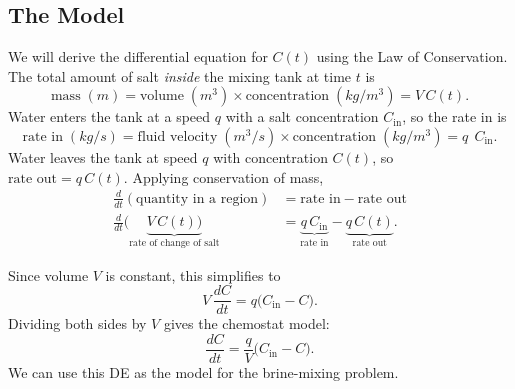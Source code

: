 \documentclass[09pt,letterpaper]{article}
\begin{document}
\subsection{The Model}

We will derive the differential equation for $C(t)$ using the Law of Conservation. The total amount of salt \emph{inside} the mixing tank at time $t$ is
\[
\text{mass} \;(m) = \text{volume} \;(m^3) \times \text{concentration} \;(kg/m^3)= V\,C(t).
\]
Water enters the tank at a speed $q$ with a salt concentration $C_{\text{in}}$, so the rate in is
\[
\text{rate in} \;(kg/s) = \text{fluid velocity}\;(m^3/s)\times \text{concentration}\;(kg/m^3)  = q\;\,C_{\text{in}}.
\]
Water leaves the tank at speed $q$ with concentration $C(t)$, so
$\text{rate out} = q\,C(t).$
Applying conservation of mass,
\begin{align*}    
\frac{d}{dt}(\text{quantity in a region}) &= \text{rate in} - \text{rate out}\\
\frac{d}{dt}\bigl(\underbrace{{V\,C(t)}\bigr)}_{\text{rate of change of salt}} &= \underbrace{q\,C_{\text{in}}}_{\text{rate in}} - \underbrace{q\,C(t)}_{\text{rate out}}.
\end{align*}

Since volume $V$ is constant, this simplifies to
\[
V\,\frac{dC}{dt} = q\bigl(C_{\text{in}} - C\bigr).
\]
Dividing both sides by $V$ gives the chemostat model:
\[
\boxed{
\frac{dC}{dt} = \frac{q}{V}\bigl(C_{\text{in}} - C\bigr).
}
\]
We can use this DE as the model for the brine-mixing problem.
\end{document}
